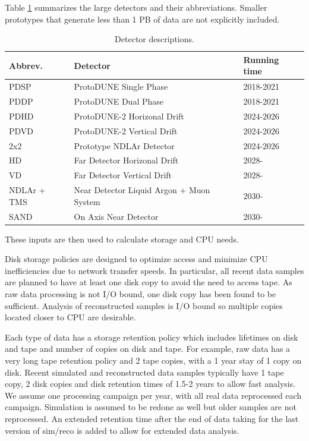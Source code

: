 \documentclass[12pt]{article}
\begin{document}
 Table \ref{tab:detectors} summarizes the large detectors and their abbreviations. Smaller prototypes that generate less than 1 PB of data  are not explicitly included. 

\begin{table}[h]
\begin{centering}
  \begin{tabular}{|l|l|l|}
     \hline
    Abbrev. & Detector & Running time\\
    \hline
    PDSP & ProtoDUNE Single Phase & 2018-2021\\
    PDDP & ProtoDUNE Dual Phase & 2018-2021\\
    PDHD & ProtoDUNE-2 Horizonal Drift & 2024-2026\\
    PDVD & ProtoDUNE-2 Vertical Drift & 2024-2026\\
    2x2& Prototype NDLAr Detector & 2024-2026\\
    HD & Far Detector Horizonal Drift & 2028-\\
    VD & Far Detector Vertical Drift & 2028-\\
    NDLAr + TMS & Near Detector Liquid Argon + Muon System & 2030-\\
    SAND & On Axis Near Detector & 2030- \\
     \hline
     \end{tabular}
       \caption{Detector descriptions. }\label{tab:detectors}
  \end{centering}
   
     \end{table}


These inputs are then used to calculate storage and CPU needs. 

Disk storage policies are designed to optimize access and minimize CPU inefficiencies due to network transfer speeds.  In particular, all recent data samples are planned to have at least one disk copy to avoid the need to access tape.  As raw data processing is not I/O bound, one disk copy has been found to be sufficient.  Analysis of reconstructed samples is I/O bound so multiple copies located closer to CPU are desirable. 

Each type of data has a storage retention policy which includes lifetimes on disk and tape and number of copies on disk and tape.  For example, raw data has a very long tape retention policy and 2 tape copies, with a 1 year stay of 1 copy on disk.   Recent simulated and reconstructed data samples typically have 1 tape copy, 2 disk copies and disk retention times of 1.5-2 years to allow fast analysis.   We assume one processing campaign per year, with all real data reprocessed each campaign.   Simulation is assumed to be redone as well but older samples are not reprocessed.  An extended retention time after the end of data taking for the last version of sim/reco is added to allow for extended data analysis. 
\end{document}
